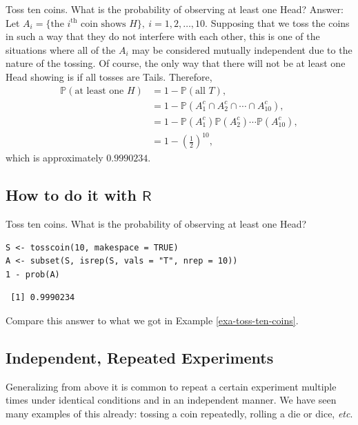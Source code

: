 \documentclass[captions=tableheading]{scrbook}
\begin{document}
\begin{example}
Toss ten coins. What is the probability of observing at least one Head? Answer: Let \(A_{i}= \{ \mbox{the }i^{\mathrm{th}}\mbox{ coin shows }H \} ,\ i=1,2,\ldots,10\). Supposing that we toss the coins in such a way that they do not interfere with each other, this is one of the situations where all of the \(A_{i}\) may be considered mutually independent due to the nature of the tossing. Of course, the only way that there will not be at least one Head showing is if all tosses are Tails. Therefore,
\begin{align*}
\mathbb{P}(\mbox{at least one }H) & =1-\mathbb{P}(\mbox{all }T),\\
 & =1-\mathbb{P}(A_{1}^{c}\cap A_{2}^{c}\cap\cdots\cap A_{10}^{c}),\\
 & =1-\mathbb{P}(A_{1}^{c})\mathbb{P}(A_{2}^{c})\cdots\mathbb{P}(A_{10}^{c}),\\
 & =1-\left(\frac{1}{2}\right)^{10},
\end{align*}
which is approximately \(0.9990234\).

\end{example}
\subsection{How to do it with \(\mathsf{R}\)}
\label{sec-4-7-1}


\begin{example}
Toss ten coins. What is the probability of observing at least one Head?


\lstset{language=R}
\begin{lstlisting}
S <- tosscoin(10, makespace = TRUE)
A <- subset(S, isrep(S, vals = "T", nrep = 10))
1 - prob(A)
\end{lstlisting}

\begin{verbatim}
 [1] 0.9990234
\end{verbatim}

Compare this answer to what we got in Example \ref{exa-toss-ten-coins}.

\end{example}
\subsection{Independent, Repeated Experiments}
\label{sec-4-7-2}


Generalizing from above it is common to repeat a certain experiment multiple times under identical conditions and in an independent manner. We have seen many examples of this already: tossing a coin repeatedly, rolling a die or dice, \emph{etc}.
\end{document}
